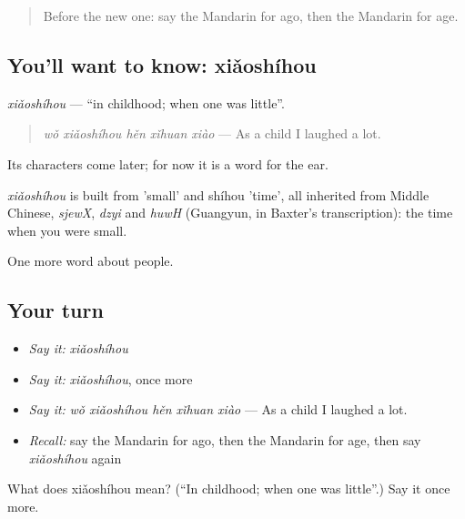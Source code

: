 \label{lesson:ZH-C78-xiaoshihou}



\begin{quote}
Before the new one: say the Mandarin for ago, then the Mandarin for age.
\end{quote}

\subsection*{You'll want to know: xiǎoshíhou}
\emph{xiǎoshíhou} — \textquotedblleft{}in childhood; when one was little\textquotedblright{}.

\begin{quote}
\emph{wǒ xiǎoshíhou hěn xǐhuan xiào} — As a child I laughed a lot.
\end{quote}

Its characters come later; for now it is a word for the ear.

\begin{cousinweb}
\emph{xiǎoshíhou} is built from  'small' and shíhou 'time', all inherited from Middle Chinese, \emph{sjewX}, \emph{dzyi} and \emph{huwH} (Guangyun, in Baxter's transcription): the time when you were small.
\end{cousinweb}

\begin{grammarlens}[title={What you've built}]
One more word about people.
\end{grammarlens}

\subsection*{Your turn}
\begin{itemize}
\raggedright
  \item \emph{Say it:} \emph{xiǎoshíhou}
  \item \emph{Say it:} \emph{xiǎoshíhou}, once more
  \item \emph{Say it:} \emph{wǒ xiǎoshíhou hěn xǐhuan xiào} — As a child I laughed a lot.
  \item \emph{Recall:} say the Mandarin for ago, then the Mandarin for age, then say \emph{xiǎoshíhou} again
\end{itemize}

\begin{tcolorbox}[breakable,colback=teal!4,colframe=teal!35!black,title={Before you move on}]
What does xiǎoshíhou mean? (\textquotedblleft{}In childhood; when one was little\textquotedblright{}.) Say it once more.
\end{tcolorbox}
